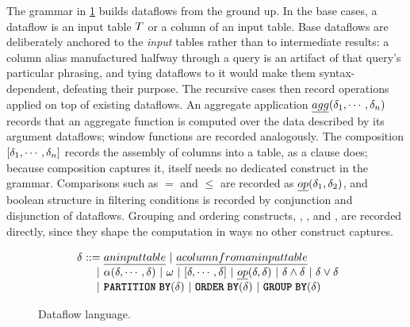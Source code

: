 The grammar in \cref{slab:fig:dataflowlanguage} builds dataflows from
the ground up. In the base cases, a dataflow is an input table
$T$ or a column of an input table. Base dataflows are
deliberately anchored to the \emph{input} tables rather than to
intermediate results: a column alias manufactured halfway through a
query is an artifact of that query's particular phrasing, and tying
dataflows to it would make them syntax-dependent, defeating their
purpose. The recursive cases then record operations applied on top of
existing dataflows. An aggregate application
$\emph{agg}(\delta_1, \cdots, \delta_n)$ records that
an aggregate function is computed over the data described by its
argument dataflows; window functions are recorded analogously. The
composition $[\delta_1, \cdots, \delta_n]$ records
the assembly of columns into a table, as a \sqlselectcolor clause
does; because composition captures it, \sqlselectcolor itself needs no
dedicated construct in the grammar. Comparisons such as $=$ and $\leq$
are recorded as $\emph{op}(\delta_1, \delta_2)$, and
boolean structure in filtering conditions is recorded by conjunction
and disjunction of dataflows. Grouping and ordering constructs,
\sqlgroupbycolor, \sqlorderbycolor, and \sqlpartitionbycolor, are
recorded directly, since they shape the computation in ways no other
construct captures.

\begin{figure}[!t]
\vspace{10pt}
\footnotesize 
\centering
\[
\arraycolsep=1.5pt\def\arraystretch{1.1}
\begin{array}{rrll}
&
\dataflowchain & 
\grammareq & 
\emph{an input table} \ | \ 
\emph{a column from an input table}  \\ 
& & \ \ \ | &  
\agg(\dataflowchain, \mydots, \dataflowchain) \ | \ 
\windowfunc \ | \ 
[\dataflowchain, \mydots, \dataflowchain] \ | \ 
\emph{op}(\dataflowchain, \dataflowchain) \ | \ 
\dataflowchain \land \dataflowchain \ | \ 
\dataflowchain \lor \dataflowchain \\ 
& & \ \ \ | &  
\sqlpartitionby(\dataflowchain) \ | \ 
\sqlorderby(\dataflowchain) \ | \ 
\sqlgroupby(\dataflowchain) \\ 
\end{array}
\]
\vspace{-12pt}
\caption{Dataflow language.}
\label{slab:fig:dataflowlanguage}
\vspace{-12pt}
\end{figure}

